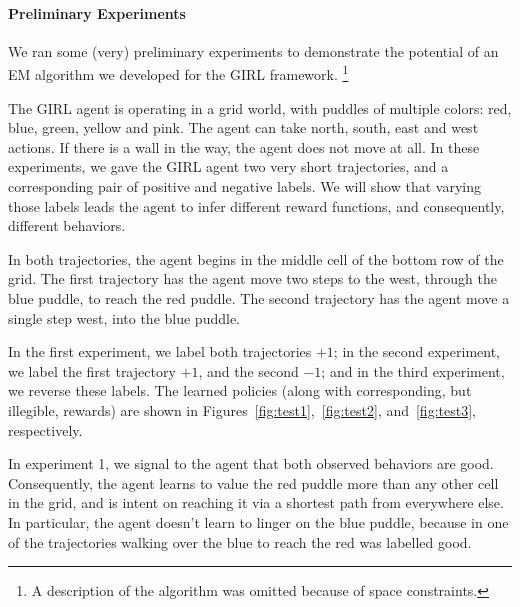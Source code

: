 
\vspace{\up}
\paragraph{Preliminary Experiments}

We ran some (very) preliminary experiments to demonstrate the
potential of an EM algorithm we developed for the GIRL framework.%
\footnote{A description of the algorithm was omitted because of space constraints.}

The GIRL agent is operating in a grid world, with puddles of multiple
colors: red, blue, green, yellow and pink. The agent can take north,
south, east and west actions.  If there is a wall in the way, the
agent does not move at all.
In these experiments, we gave the GIRL agent two very short
trajectories, and a corresponding pair of positive and negative
labels.  We will show that varying those labels leads the agent to
infer different reward functions, and consequently, different
behaviors.

In both trajectories, the agent begins in the middle cell of the
bottom row of the grid.  The first trajectory has the agent move two
steps to the west, through the blue puddle, to reach the red puddle.
The second trajectory has the agent move a single step west, into the
blue puddle.


In the first experiment, we label both trajectories $+1$; in the
second experiment, we label the first trajectory $+1$, and the second
$-1$; and in the third experiment, we reverse these labels.  The
learned policies (along with corresponding, but illegible, rewards)
are shown in Figures~\ref{fig:test1},~\ref{fig:test2},
and~\ref{fig:test3}, respectively.

In experiment 1, we signal to the agent that both observed behaviors
are good.  Consequently, the agent learns to value the red puddle more
than any other cell in the grid, and is intent on reaching it via a
shortest path from everywhere else.  In particular, the agent doesn't
learn to linger on the blue puddle, because in one of the trajectories
walking over the blue to reach the red was labelled good.

